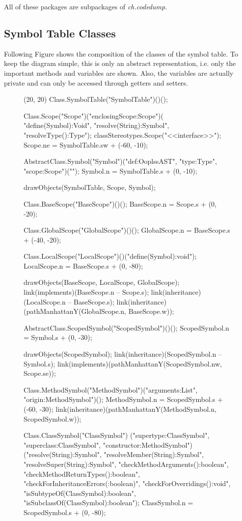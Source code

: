 All of these packages are subpackages of \emph{ch.codedump}.

\subsection{Symbol Table Classes}

Following Figure shows the composition of the classes of the symbol table.
To keep the diagram simple, this is only an abstract representation, i.e. only 
the important methods and variables are shown. Also, the variables are actually 
private and can only be accessed through getters and setters.

\begin{figure}[H]
	\centering
	\begin{emp}[classdiag](20, 20)
	Class.SymbolTable("SymbolTable")()();

	Class.Scope("Scope")("enclosingScope:Scope")( "define(Symbol):Void",
			"resolve(String):Symbol", "resolveType():Type");
	classStereotypes.Scope("<<interface>>");
	Scope.ne = SymbolTable.sw + (-60, -10);

	AbstractClass.Symbol("Symbol")("def:OoplssAST", "type:Type", "scope:Scope")("");
	Symbol.n = SymbolTable.s + (0, -10);

	drawObjects(SymbolTable, Scope, Symbol);

	Class.BaseScope("BaseScope")()();
	BaseScope.n = Scope.s + (0, -20);

	Class.GlobalScope("GlobalScope")()();
	GlobalScope.n = BaseScope.s + (-40, -20);

	Class.LocalScope("LocalScope")()("define(Symbol):void");
	LocalScope.n = BaseScope.s + (0, -80);

	drawObjects(BaseScope, LocalScope, GlobalScope);
	link(implements)(BaseScope.n -- Scope.s);
	link(inheritance)(LocalScope.n -- BaseScope.s);
	link(inheritance)(pathManhattanY(GlobalScope.n, BaseScope.w));

	AbstractClass.ScopedSymbol("ScopedSymbol")()();
	ScopedSymbol.n = Symbol.s + (0, -30);

	drawObjects(ScopedSymbol);
	link(inheritance)(ScopedSymbol.n -- Symbol.s);
	link(implements)(pathManhattanY(ScopedSymbol.nw, Scope.se));

	Class.MethodSymbol("MethodSymbol")("arguments:List", "origin:MethodSymbol")();
	MethodSymbol.n = ScopedSymbol.s + (-60, -30);
	link(inheritance)(pathManhattanY(MethodSymbol.n, ScopedSymbol.w));

	Class.ClassSymbol("ClassSymbol")
		("supertype:ClassSymbol", "superclass:ClassSymbol", "constructor:MethodSymbol")
		("resolve(String):Symbol", "resolveMember(String):Symbol",
		"resolveSuper(String):Symbol",
		"checkMethodArguments():boolean", "checkMethodReturnTypes():boolean",
		"checkForInheritanceErrors(:boolean)", "checkForOverridings():void",
		"isSubtypeOf(ClassSymbol):boolean", "isSubclassOf(ClassSymbol):boolean");
	ClassSymbol.n = ScopedSymbol.s + (0, -80);


\end{emp}
\end{figure}
